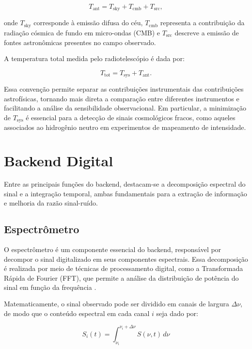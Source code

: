 \begin{equation}
T_{\mathrm{ant}}
=
T_{\mathrm{sky}}
+
T_{\mathrm{cmb}}
+
T_{\mathrm{src}},
\end{equation}

onde $T_{\mathrm{sky}}$ corresponde à emissão difusa do céu, $T_{\mathrm{cmb}}$ representa a contribuição da radiação cósmica de fundo em micro-ondas (CMB) e $T_{\mathrm{src}}$ descreve a emissão de fontes astronômicas presentes no campo observado.

A temperatura total medida pelo radiotelescópio é dada por:

\begin{equation}
T_{\mathrm{tot}}
=
T_{\mathrm{sys}}
+
T_{\mathrm{ant}}.
\end{equation}

Essa convenção permite separar as contribuições instrumentais das contribuições astrofísicas, tornando mais direta a comparação entre diferentes instrumentos e facilitando a análise da sensibilidade observacional. Em particular, a minimização de $T_{\mathrm{sys}}$ é essencial para a detecção de sinais cosmológicos fracos, como aqueles associados ao hidrogênio neutro em experimentos de mapeamento de intensidade.

\section{Backend Digital}

Entre as principais funções do backend, destacam-se a decomposição espectral do sinal e a integração temporal, ambas fundamentais para a extração de informação e melhoria da razão sinal-ruído.

\subsection{Espectrômetro}

O espectrômetro é um componente essencial do backend, responsável por decompor o sinal digitalizado em seus componentes espectrais. Essa decomposição é realizada por meio de técnicas de processamento digital, como a Transformada Rápida de Fourier (FFT), que permite a análise da distribuição de potência do sinal em função da frequência \cite{burke2019introduction}.

Matematicamente, o sinal observado pode ser dividido em canais de largura $\Delta \nu$, de modo que o conteúdo espectral em cada canal $i$ seja dado por:

\begin{equation}
    S_i(t) = \int_{\nu_i}^{\nu_i + \Delta \nu} S(\nu, t)\, d\nu
\end{equation}

